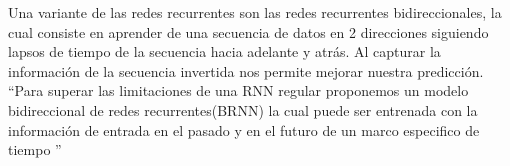 Una variante de las redes recurrentes son las redes recurrentes bidireccionales, la cual consiste en aprender de una secuencia de datos en 2 direcciones siguiendo lapsos de tiempo de la secuencia hacia adelante y atrás. Al capturar la información de la secuencia invertida nos permite mejorar nuestra predicción.	\textquotedblleft Para superar las limitaciones de una RNN regular proponemos un modelo bidireccional de redes recurrentes(BRNN) la cual puede ser entrenada con la información de entrada en el pasado y en el futuro de un marco especifico de tiempo \textquotedblright \cite{BRNN}





